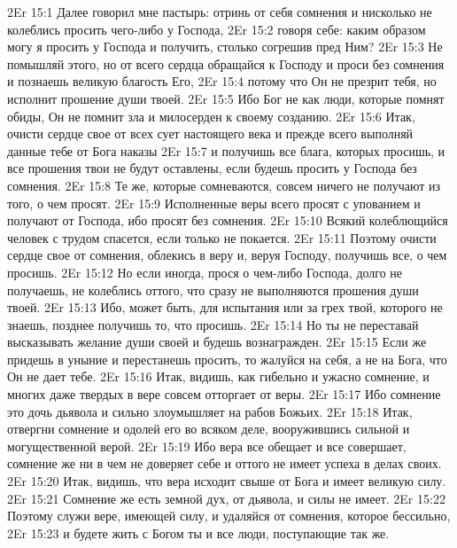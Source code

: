 \vs 2Er 15:1
Далее говорил мне пастырь:
отринь от себя сомнения и нисколько не колеблись просить
чего-либо у Господа,
\vs 2Er 15:2
говоря себе: каким образом
могу я просить у Господа и получить, столько согрешив пред Ним?
\vs 2Er 15:3
Не помышляй этого, но от
всего сердца обращайся к Господу и проси без сомнения и познаешь великую
благость Его,
\vs 2Er 15:4
потому что Он не презрит
тебя, но исполнит прошение души твоей.
\vs 2Er 15:5
Ибо Бог не как люди,
которые помнят обиды, Он не помнит зла и милосерден к своему созданию.
\vs 2Er 15:6
Итак, очисти сердце свое
от всех сует настоящего века и прежде всего выполняй данные тебе от Бога
наказы
\vs 2Er 15:7
и получишь все блага,
которых просишь, и все прошения твои не будут оставлены, если будешь просить у
Господа без сомнения.
\vs 2Er 15:8
Те же, которые
сомневаются, совсем ничего не получают из того, о чем просят.
\vs 2Er 15:9
Исполненные веры всего
просят с упованием и получают от Господа, ибо просят без сомнения.
\vs 2Er 15:10
Всякий колеблющийся
человек с трудом спасется, если только не покается.
\vs 2Er 15:11
Поэтому очисти сердце
свое от сомнения, облекись в веру и, веруя Господу, получишь все, о чем
просишь.
\vs 2Er 15:12
Но если иногда, прося о
чем-либо Господа, долго не получаешь, не колеблись оттого, что сразу не
выполняются прошения души твоей.
\vs 2Er 15:13
Ибо, может быть, для
испытания или за грех твой, которого не знаешь, позднее получишь то, что
просишь.
\vs 2Er 15:14
Но ты не переставай
высказывать желание души своей и будешь вознагражден.
\vs 2Er 15:15
Если же придешь в уныние
и перестанешь просить, то жалуйся на себя, а не на Бога, что Он не дает тебе.
\vs 2Er 15:16
Итак, видишь, как
гибельно и ужасно сомнение, и многих даже твердых в вере совсем отторгает от
веры.
\vs 2Er 15:17
Ибо сомнение это дочь
дьявола и сильно злоумышляет на рабов Божьих.
\vs 2Er 15:18
Итак, отвергни сомнение и
одолей его во всяком деле, вооружившись сильной и могущественной верой.
\vs 2Er 15:19
Ибо вера все обещает и
все совершает, сомнение же ни в чем не доверяет себе и оттого не имеет успеха
в делах своих.
\vs 2Er 15:20
Итак, видишь, что вера
исходит свыше от Бога и имеет великую силу.
\vs 2Er 15:21
Сомнение же есть земной
дух, от дьявола, и силы не имеет.
\vs 2Er 15:22
Поэтому служи вере,
имеющей силу, и удаляйся от сомнения, которое бессильно,
\vs 2Er 15:23
и будете жить с Богом
ты и все люди, поступающие так же.

